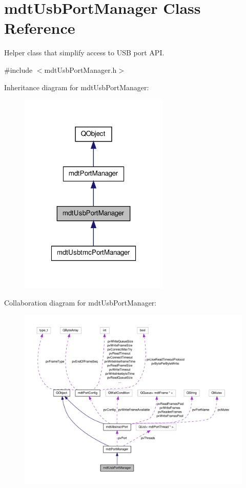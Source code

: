 \hypertarget{classmdt_usb_port_manager}{\section{mdt\-Usb\-Port\-Manager Class Reference}
\label{classmdt_usb_port_manager}
}


Helper class that simplify access to U\-S\-B port A\-P\-I.  




{\ttfamily \#include $<$mdt\-Usb\-Port\-Manager.\-h$>$}



Inheritance diagram for mdt\-Usb\-Port\-Manager\-:\nopagebreak
\begin{figure}[H]
\begin{center}
\leavevmode
\includegraphics[width=202pt]{classmdt_usb_port_manager__inherit__graph}
\end{center}
\end{figure}


Collaboration diagram for mdt\-Usb\-Port\-Manager\-:\nopagebreak
\begin{figure}[H]
\begin{center}
\leavevmode
\includegraphics[width=350pt]{classmdt_usb_port_manager__coll__graph}
\end{center}
\end{figure}
